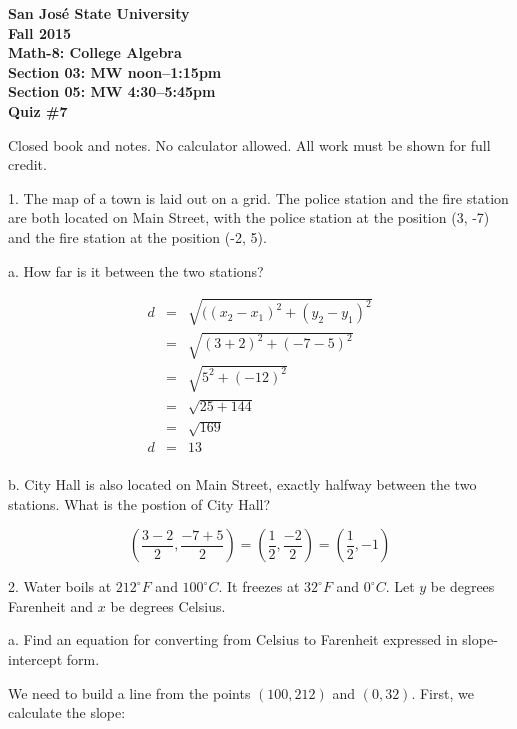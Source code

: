 \documentclass[letterpaper, 12pt]{article}
\begin{document}
\begin{center}
\bfseries
San Jos\'{e} State University \\
Fall 2015 \\
Math-8: College Algebra \\
Section 03: MW noon--1:15pm \\
Section 05: MW 4:30--5:45pm \\
\bigskip
Quiz \#7
\end{center}

\bigskip

Closed book and notes. No calculator allowed. All work must be shown for full
credit.

\bigskip

1. The map of a town is laid out on a grid. The police station and the fire
station are both located on Main Street, with the police station at the
position (3, -7) and the fire station at the position (-2, 5).

\bigskip

a. How far is it between the two stations?

\begin{eqnarray*}
d &=& \sqrt{((x_2-x_1)^2+(y_2-y_1)^2} \\
  &=& \sqrt{(3+2)^2+(-7-5)^2} \\
  &=& \sqrt{5^2+(-12)^2} \\
  &=& \sqrt{25+144} \\
  &=& \sqrt{169} \\
d &=& 13 \\
\end{eqnarray*}

b. City Hall is also located on Main Street, exactly halfway between the two
stations. What is the postion of City Hall?

\[\left(\frac{3-2}{2},\frac{-7+5}{2}\right)=
    \left(\frac{1}{2},\frac{-2}{2}\right)=
    \left(\frac{1}{2},-1\right)\]

\newpage

2. Water boils at $212^{\circ} F$ and $100^{\circ} C$. It freezes at $32^{\circ}F$
and $0^{\circ}C$. Let $y$ be degrees Farenheit and $x$ be degrees Celsius.

\bigskip

a. Find an equation for converting from Celsius to Farenheit expressed in
slope-intercept form.

\bigskip

We need to build a line from the points $(100,212)$ and $(0,32)$. First, we
calculate the slope:
\end{document}
